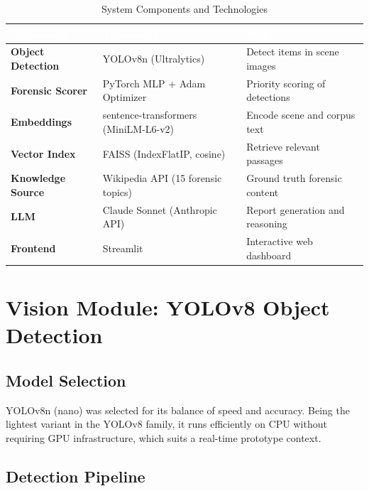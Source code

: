 \documentclass[12pt,a4paper]{article}
\begin{document}
\begin{table}[h!]
  \centering
  \caption{System Components and Technologies}
  \begin{tabular}{>{\bfseries}p{4cm} p{5cm} p{5cm}}
    \toprule
    \rowcolor{tableheader}
    \textcolor{white}{Component} & \textcolor{white}{Technology} & \textcolor{white}{Role} \\
    \midrule
    Object Detection     & YOLOv8n (Ultralytics)               & Detect items in scene images \\
    \addlinespace
    Forensic Scorer      & PyTorch MLP + Adam Optimizer         & Priority scoring of detections \\
    \addlinespace
    Embeddings           & sentence-transformers (MiniLM-L6-v2) & Encode scene and corpus text \\
    \addlinespace
    Vector Index         & FAISS (IndexFlatIP, cosine)          & Retrieve relevant passages \\
    \addlinespace
    Knowledge Source     & Wikipedia API (15 forensic topics)   & Ground truth forensic content \\
    \addlinespace
    LLM                  & Claude Sonnet (Anthropic API)        & Report generation and reasoning \\
    \addlinespace
    Frontend             & Streamlit                            & Interactive web dashboard \\
    \bottomrule
  \end{tabular}
\end{table}

\section{Vision Module: YOLOv8 Object Detection}

\subsection{Model Selection}

YOLOv8n (nano) was selected for its balance of speed and accuracy. Being the
lightest variant in the YOLOv8 family, it runs efficiently on CPU without
requiring GPU infrastructure, which suits a real-time prototype context.

\subsection{Detection Pipeline}
\end{document}

